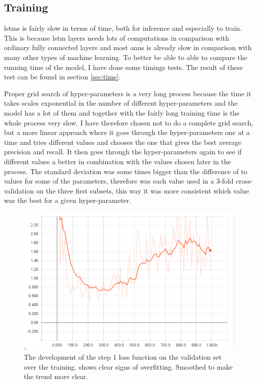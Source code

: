 \subsection{Training}
\glspl{lstm} is fairly slow in terms of time, both for inference and especially to train.
This is because \gls{lstm} layers needs lots of computations in comparison with ordinary 
fully connected layers and most \glspl{ann} is already slow in comparison with many 
other types of machine learning.
To better be able to able to compare the running time of the model, I have done 
some timings tests. The result of these test can be found in section \ref{sec:time}.

Proper grid search of hyper-parameters is a very long process because the time it takes
scales exponential in the number of different hyper-parameters and the model has a lot 
of them and together with the fairly long training time is the whole process very slow.
I have therefore chosen not to do a complete grid search,
but a more linear approach where it goes through the hyper-parameters one at a time and
tries different values and chooses the one that gives the best average precision and recall.
It then goes through the hyper-parameters again to see if different values a better in 
combination with the values chosen later in the process.
The standard deviation was some times bigger than the difference of to values for some 
of the parameters, therefore was each value used in a 3-fold cross-validation on the 
three first subsets, this way it was more consistent which value was the best for a 
given hyper-parameter.

\begin{figure}
	\centering
	\includegraphics[width=\textwidth]{sections/experiments/overfitting}
	\caption{The development of the step 1 loss function on the validation set over the training.
	shows clear signs of overfitting. Smoothed to make the trend more clear.}
	\label{fig:overfitting}
\end{figure}

